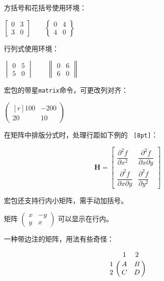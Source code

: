 方括号和花括号使用环境：
\begin{codeshow}
\centering $\begin{bmatrix}
0 & 3 \\ 3 & 0 \end{bmatrix}\qquad
\begin{Bmatrix} 0 & 4 \\
4 & 0 \end{Bmatrix}$
\end{codeshow}

行列式使用环境：
\begin{codeshow}
\centering $\begin{vmatrix}
0 & 5 \\ 5 & 0 \end{vmatrix}\qquad
\begin{Vmatrix} 0 & 6 \\
6 & 0 \end{Vmatrix}$
\end{codeshow}

宏包的带星\texttt{matrix}命令，可更改列对齐：
\begin{codeshow}
$\begin{pmatrix*}[r]
100 & -200 \\ 20 & 10
\end{pmatrix*}$
\end{codeshow}

在矩阵中排版分式时，处理行距如下例的 \texttt{ [8pt]}：
\begin{codeshow}
\[\mathbf{H}=\begin{bmatrix}
\dfrac{\partial^2 f}{\partial x^2} &
\dfrac{\partial^2 f}
{\partial x \partial y} \\[8pt]
\dfrac{\partial^2 f}
{\partial x \partial y} &
\dfrac{\partial^2 f}{\partial y^2}
\end{bmatrix}\]
\end{codeshow}

宏包还支持行内小矩阵，需手动加括号。
\begin{codeshow}
矩阵 $\left(\begin{smallmatrix}
x & -y\\ y & x\end{smallmatrix}
\right)$ 可以显示在行内。
\end{codeshow}

一种带边注的矩阵，用法有些奇怪：
\begin{codeshow}
\[\bordermatrix{& 1 & 2\cr
1 & A & B \cr
2 & C & D \cr} \]
\end{codeshow}

